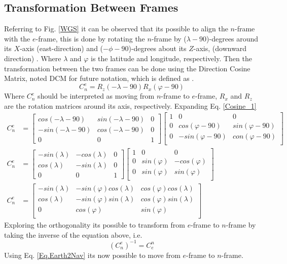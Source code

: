 \subsection{Transformation Between Frames}
Referring to Fig. \ref{WGS} it can be observed that its possible to align the $n$-frame with the $e$-frame, this is done by rotating the $n$-frame by ($\lambda-90$)-degrees around its $X$-axis (east-direction) and ($-\phi-90$)-degrees about its $Z$-axis, (downward direction) \cite{nonlinear}. Where $\lambda$ and $\varphi$ is the latitude and longitude, respectively. Then the transformation between the two frames can be done using the Direction Cosine Matrix, noted DCM for future notation, which is defined as \cite{nonlinear}.
\begin{equation}
C_n^e=R_z(-\lambda-90)R_x(\varphi-90)
\label{Cosine_1}
\end{equation}
Where $C_n^e$ should be interpreted as moving from $n$-frame to $e$-frame, $R_x$ and $R_z$ are the rotation matrices around its axis, respectively. Expanding Eq. \eqref{Cosine_1} 
\begin{align}
C_n^e &=
\begin{bmatrix}
cos(-\lambda-90) & sin(-\lambda-90) & 0\\
-sin(-\lambda-90) & cos(-\lambda-90) & 0\\
0 & 0 & 1
\end{bmatrix}
\begin{bmatrix}
1 & 0 & 0\\
0 & cos(\varphi-90) & sin(\varphi-90) \\
0 & -sin(\varphi-90) & con(\varphi-90) \\
\end{bmatrix}\\
C_n^e &=
\begin{bmatrix}
-sin(\lambda) & -cos(\lambda) & 0\\
cos(\lambda) & -sin(\lambda) & 0\\
0 & 0 & 1
\end{bmatrix}
\begin{bmatrix}
1 & 0 & 0\\
0 & sin(\varphi) & -cos(\varphi) \\
0 & sin(\varphi) & sin(\varphi) \\
\end{bmatrix}\\
C_n^e &=
\begin{bmatrix}
-sin(\lambda) & -sin(\varphi)cos(\lambda) & cos(\varphi)cos(\lambda) \\
cos(\lambda) & -sin(\varphi)sin(\lambda) &  cos(\varphi)sin(\lambda) \\
0 & cos(\varphi) & sin(\varphi) \\
\end{bmatrix}
\end{align}
Exploring the orthogonality its possible to transform from $e$-frame to $n$-frame by taking the inverse of the equation above, i.e.
\begin{equation}
(C_n^e)^{-1}=C_e^n
\label{Eq.Earth2Nav}
\end{equation}
Using Eq. \eqref{Eq.Earth2Nav} its now possible to move from $e$-frame to $n$-frame. \\


